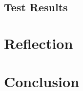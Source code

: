 \documentclass[a4paper,11pt]{article}
\begin{document}
\subsection{Test Results}


\pagebreak


\pagebreak
\section{Reflection}


\pagebreak
\section{Conclusion}


\pagebreak


\pagebreak
\appendix

\end{document}
